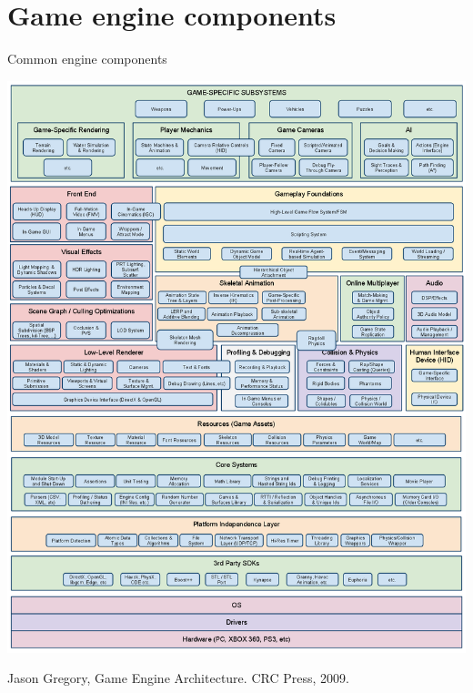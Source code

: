 \part{Game engine components}
\frame{\partpage}

\begin{frame}{Common engine components}
	\begin{center}
		\includegraphics[height=0.8\textheight]{architecture}
	\end{center}
	{\tiny Jason Gregory, Game Engine Architecture. CRC Press, 2009.}
\end{frame}